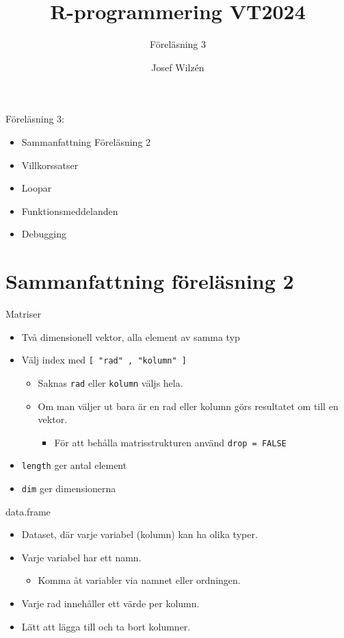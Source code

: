 \documentclass[
  11pt,
  ignorenonframetext,
]{beamer}
\title{R-programmering VT2024}
\subtitle{Föreläsning 3}
\author{Josef Wilzén}
\date{}
\institute{Linköpings Universitet}
\providecommand{\tightlist}{%
  \setlength{\itemsep}{0pt}\setlength{\parskip}{0pt}}
\begin{document}
\frame{\titlepage}

\begin{frame}{Föreläsning 3:}
\label{fuxf6reluxe4sning-3}
\begin{itemize}
\tightlist
\item
  Sammanfattning Föreläsning 2
\item
  Villkorssatser
\item
  Loopar
\item
  Funktionsmeddelanden
\item
  Debugging
\end{itemize}
\end{frame}

\section{Sammanfattning föreläsning
2}\label{sammanfattning-fuxf6reluxe4sning-2}

\begin{frame}{Matriser}
\label{matriser}
\begin{itemize}
\tightlist
\item
  Två dimensionell vektor, alla element av samma typ
\item
  Välj index med \texttt{[ "rad" , "kolumn" ]}

  \begin{itemize}
  \tightlist
  \item
    Saknas \texttt{rad} eller \texttt{kolumn} väljs hela.
  \item
    Om man väljer ut bara är en rad eller kolumn görs resultatet om till
    en vektor.

    \begin{itemize}
    \tightlist
    \item
      För att behålla matrisstrukturen använd \texttt{drop = FALSE}
    \end{itemize}
  \end{itemize}
\item
  \texttt{length} ger antal element
\item
  \texttt{dim} ger dimensionerna
\end{itemize}
\end{frame}

\begin{frame}{data.frame}
\label{data.frame}
\begin{itemize}
\tightlist
\item
  Dataset, där varje variabel (kolumn) kan ha olika typer.
\item
  Varje variabel har ett namn.

  \begin{itemize}
  \tightlist
  \item
    Komma åt variabler via namnet eller ordningen.
  \end{itemize}
\item
  Varje rad innehåller ett värde per kolumn.
\item
  Lätt att lägga till och ta bort kolumner.
\end{itemize}
\end{frame}
\end{document}
